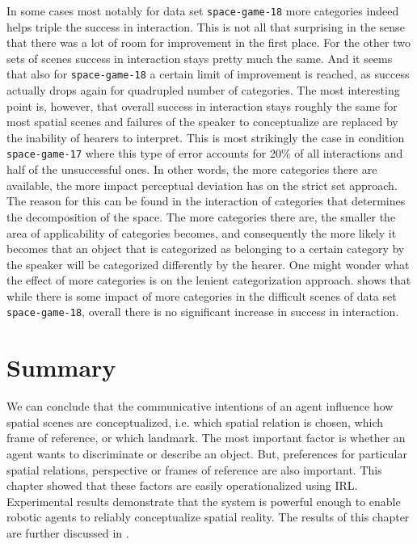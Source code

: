 In some cases most notably for data set {\footnotesize\tt space-game-18} 
more categories indeed helps triple the success in interaction. This is not all that
surprising in the sense that there was a lot of room for improvement in the 
first place. For the other two sets of scenes success in interaction stays 
pretty much the same. And it seems that also for {\footnotesize\tt space-game-18} a certain
limit of improvement is reached, as success actually drops again for quadrupled
number of categories. The most interesting point is, however, that overall 
success in interaction stays roughly the same for most spatial scenes 
and failures of the speaker to conceptualize
are replaced by the inability of hearers to interpret. This is most strikingly the case
in condition {\footnotesize\tt space-game-17} where this type of error accounts for 20\% of all
interactions and half of the unsuccessful ones. In other words, the more categories 
there are available, the more impact perceptual deviation has on the strict set approach.
The reason for this can be found in the interaction of categories that determines 
the decomposition of the space. The more categories there are, the smaller the 
area of applicability of categories
becomes, and consequently the more likely it becomes that an object that is
categorized as belonging to a certain category by the speaker will be 
categorized differently by the hearer. One might
wonder what the effect of more categories is on the lenient categorization
approach.  shows that while there
is some impact of more categories in the difficult scenes of data set
{\footnotesize\tt space-game-18}, overall there is no significant increase in success in
interaction.

\section{Summary}
We can conclude that the communicative intentions of an agent influence
how spatial scenes are conceptualized, i.e. which spatial relation is chosen, 
which frame of reference, or which landmark. The most important
factor is whether an agent wants to discriminate or describe an object.
But, preferences for particular spatial relations, perspective or frames of 
reference are also important. This chapter showed that these factors
are easily operationalized using IRL. Experimental results demonstrate that the system
is powerful enough to enable robotic agents to reliably conceptualize 
spatial reality. The results of this chapter are further discussed in \cite{pauw2010embodied,pauw2012embodied,spranger2012deviation}.



% 
% 
% 
